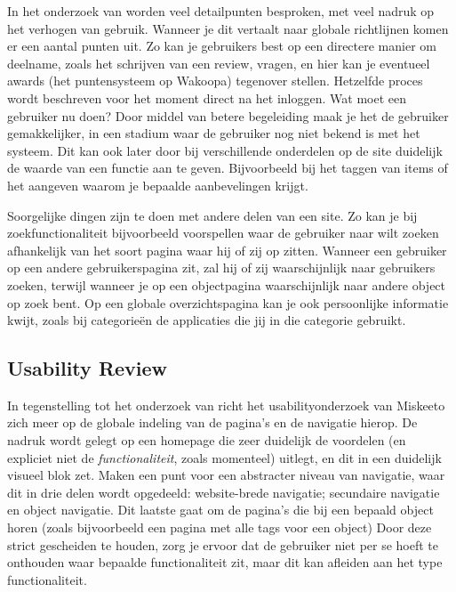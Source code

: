 \documentclass[a4paper, 10pt, pdftex]{report}
\begin{document}
    In het onderzoek van \citeauthor{Alfrink2008} worden veel detailpunten besproken, met veel nadruk op het verhogen van gebruik. Wanneer je dit vertaalt naar globale richtlijnen komen er een aantal punten uit. Zo kan je gebruikers best op een directere manier om deelname, zoals het schrijven van een review, vragen, en hier kan je eventueel awards (het puntensysteem op Wakoopa) tegenover stellen. Hetzelfde proces wordt beschreven voor het moment direct na het inloggen. Wat moet een gebruiker nu doen? Door middel van betere begeleiding maak je het de gebruiker gemakkelijker, in een stadium waar de gebruiker nog niet bekend is met het systeem. Dit kan ook later door bij verschillende onderdelen op de site duidelijk de waarde van een functie aan te geven. Bijvoorbeeld bij het taggen van items of het aangeven waarom je bepaalde aanbevelingen krijgt.

    Soorgelijke dingen zijn te doen met andere delen van een site. Zo kan je bij zoekfunctionaliteit bijvoorbeeld voorspellen waar de gebruiker naar wilt zoeken afhankelijk van het soort pagina waar hij of zij op zitten. Wanneer een gebruiker op een andere gebruikerspagina zit, zal hij of zij waarschijnlijk naar gebruikers zoeken, terwijl wanneer je op een objectpagina waarschijnlijk naar andere object op zoek bent. Op een globale overzichtspagina kan je ook persoonlijke informatie kwijt, zoals bij categorie\"en de applicaties die jij in die categorie gebruikt.

    \subsection{Usability Review \citet{Hoekman2008}}
    In tegenstelling tot het onderzoek van \citeauthor{Alfrink2008} richt het usabilityonderzoek van Miskeeto zich meer op de globale indeling van de pagina's en de navigatie hierop. De nadruk wordt gelegt op een homepage die zeer duidelijk de voordelen (en expliciet niet de \emph{functionaliteit}, zoals momenteel) uitlegt, en dit in een duidelijk visueel blok zet. \citeauthor{Hoekman2008} Maken een punt voor een abstracter niveau van navigatie, waar dit in drie delen wordt opgedeeld: website-brede navigatie; secundaire navigatie en object navigatie. Dit laatste gaat om de pagina's die bij een bepaald object horen (zoals bijvoorbeeld een pagina met alle tags voor een object) Door deze strict gescheiden te houden, zorg je ervoor dat de gebruiker niet per se hoeft te onthouden waar bepaalde functionaliteit zit, maar dit kan afleiden aan het type functionaliteit.
\end{document}
